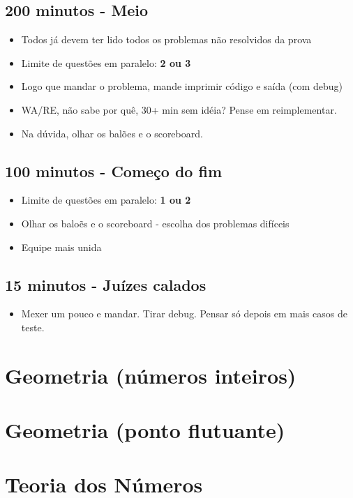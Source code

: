 \documentclass[oneside, landscape, twocolumn, a4wide, 9pt]{scrartcl}
\begin{document}
\subsection{200 minutos - Meio}
\begin{itemize}
\item Todos já devem ter lido todos os problemas não resolvidos da prova
\item Limite de questões em paralelo: {\bf 2 ou 3}
\item Logo que mandar o problema, mande imprimir código e saída (com debug)
\item WA/RE, não sabe por quê, 30+ min sem idéia? Pense em reimplementar.
\item Na dúvida, olhar os balões e o scoreboard.
\end{itemize}
\subsection{100 minutos - Começo do fim}
\begin{itemize}
\item Limite de questões em paralelo: {\bf 1 ou 2}
\item Olhar os baloẽs e o scoreboard - escolha dos problemas difíceis
\item Equipe mais unida
\end{itemize}
\subsection{15 minutos - Juízes calados}
\begin{itemize}
\item Mexer um pouco e mandar. Tirar debug. Pensar só depois em mais casos de teste.
\end{itemize}

\section{Geometria (números inteiros)}

\section{Geometria (ponto flutuante)}

\section{Teoria dos Números}
\end{document}
